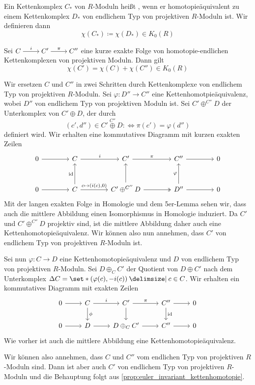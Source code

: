 \begin{definition}[{name=[homologie-endlich]}]
    Ein Kettenkomplex $C_*$ von $R$-Moduln heißt , wenn er homotopieäquivalent zu einem Kettenkomplex $D_*$ von endlichem Typ von projektiven $R$-Moduln ist.
    Wir definieren dann 
    \[
        \chi(C_*) \coloneqq \chi(D_*) \in K_0(R)
    \]
\end{definition}

\begin{lemma}[{name=[{Euler-Charakteristik einer kurzen exakten Folge von Kettenkomplexen}]}]
    Sei 
    \(
    	\begin{tikzcd}[cramped]
            C \rar["i"] & C' \rar["\pi"] & C''
        \end{tikzcd}
    \) 
	eine kurze exakte Folge von homotopie-endlichen Kettenkomplexen von projektiven Moduln.
	Dann gilt
	\[
		\chi(C') = \chi(C) + \chi(C'') \in K_0(R)
	\]
\end{lemma}
\begin{beweis}
	Wir ersetzen $C$ und $C''$ in zwei Schritten durch Kettenkomplexe von endlichem Typ von projektiven $R$-Moduln.
	Sei $\varphi \colon D'' \to C''$ eine Kettenhomotpieäquivalenz, wobei $D''$ von endlichem Typ von projektiven Moduln ist.
	Sei $C' \oplus^{C''} D$ der Unterkomplex von $C' \oplus D$, der durch 
	\[
		(c',d'') \in C' \stackrel{C''}{\oplus} D :\Leftrightarrow \pi(c') =\varphi(d'')
	\]
	definiert wird.
	Wir erhalten eine kommutatives Diagramm mit kurzen exakten Zeilen
	\[
		\begin{tikzcd}[column sep=4em,row sep=2.8em]
			0 \rar & C \rar["i"] & C' \rar["\pi"] & C'' \rar & 0 \\
			0 \rar & C \rar["{c \mapsto (i(c),0)}"] \uar["\id"] & C' \oplus^{C''} D \rar[two heads] \uar & D'' \rar \uar["\varphi"] & 0
		\end{tikzcd}
	\]
	Mit der langen exakten Folge in Homologie und dem 5er-Lemma sehen wir, dass auch die mittlere Abbildung einen Isomorphismus in Homologie induziert.
	Da $C'$ und $C' \oplus^{C''} D$ projektiv sind, ist die mittlere Abbildung daher auch eine Kettenhomotopieäquivalenz.
	Wir können also nun annehmen, dass $C'$ von endlichem Typ von projektiven $R$-Moduln ist.
	
	Sei nun  $\varphi \colon C \to D$ eine Kettenhomotopieäquivalenz und $D$ von endlichem Typ von projektiven $R$-Moduln.
	Sei $D \oplus_C C'$ der Quotient von $D \oplus C'$ nach dem Unterkomplex $\Delta C = \set*{\enbrace*{\varphi(c), - i(c)} \given c \in C}$.
	Wir erhalten ein kommutatives Diagramm mit exakten Zeilen
	\[
		\begin{tikzcd}
			0 \rar &C \dar["\phi"] \rar["i"] & C' \rar["\pi"] \dar & C'' \rar \dar["\id"] & 0 \\
			0 \rar & D \rar & D \oplus_C C' \rar & C'' \rar & 0
		\end{tikzcd}
	\]
	Wie vorher ist auch die mittlere Abbildung eine Kettenhomotopieäquivalenz.
	
	Wir können also annehmen, dass $C$ und $C''$ vom endlichen Typ von projektiven $R$-Moduln sind.
	Dann ist aber auch $C'$ von endlichem Typ von projektiven $R$-Moduln und die Behauptung folgt aus \autoref{prop:euler_invariant_kettenhomotopie}.
\end{beweis}


